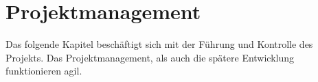 \chapter{Projektmanagement}

Das folgende Kapitel beschäftigt sich mit der Führung und Kontrolle des Projekts. Das Projektmanagement, als auch die spätere Entwicklung funktionieren agil. 






